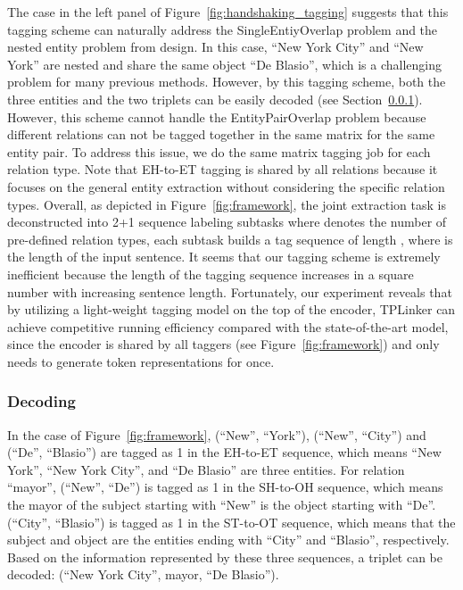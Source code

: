 \documentclass[11pt]{article}
\begin{document}
The case in the left panel of Figure~\ref{fig:handshaking_tagging} suggests that this tagging scheme can naturally address the SingleEntiyOverlap problem and the nested entity problem from design. 
In this case, ``New York City'' and ``New York'' are nested and share the same object ``De Blasio'', which is a challenging problem for many previous methods. However, by this tagging scheme, both the three entities and the two triplets can be easily decoded (see Section~\ref{sec:decoding}). 
However, this scheme cannot handle the EntityPairOverlap problem because different relations can not be tagged together in the same matrix for the same entity pair. 
To address this issue, we do the same matrix tagging job for each relation type.
Note that EH-to-ET tagging is shared by all relations because it focuses on the general entity extraction without considering the specific relation types.
Overall, as depicted in Figure~\ref{fig:framework}, the joint extraction task is deconstructed into 2+1 sequence labeling subtasks where  denotes the number of pre-defined relation types, each subtask builds a tag sequence of length , where  is the length of the input sentence.
It seems that our tagging scheme is extremely inefficient because the length of the tagging sequence increases in a square number with increasing sentence length.
Fortunately, our experiment reveals that by utilizing a light-weight tagging model on the top of the encoder, TPLinker can achieve competitive running efficiency compared with the state-of-the-art model, since the encoder is shared by all taggers (see Figure~\ref{fig:framework}) and only needs to generate  token representations for once.






\subsubsection{Decoding}\label{sec:decoding}
In the case of Figure~\ref{fig:framework}, (``New'', ``York''), (``New'', ``City'') and (``De'', ``Blasio'') are tagged as 1 in the EH-to-ET sequence, which means ``New York'', ``New York City'', and ``De Blasio'' are three entities. 
For relation ``mayor'', (``New'', ``De'') is tagged as 1 in the SH-to-OH sequence, which means the mayor of the subject starting with ``New'' is the object starting with ``De''. 
(``City'', ``Blasio'') is tagged as 1 in the ST-to-OT sequence, which means that the subject and object are the entities ending with ``City'' and ``Blasio'', respectively. 
Based on the information represented by these three sequences, a triplet can be decoded: (``New York City'', mayor, ``De Blasio''). 
\end{document}
